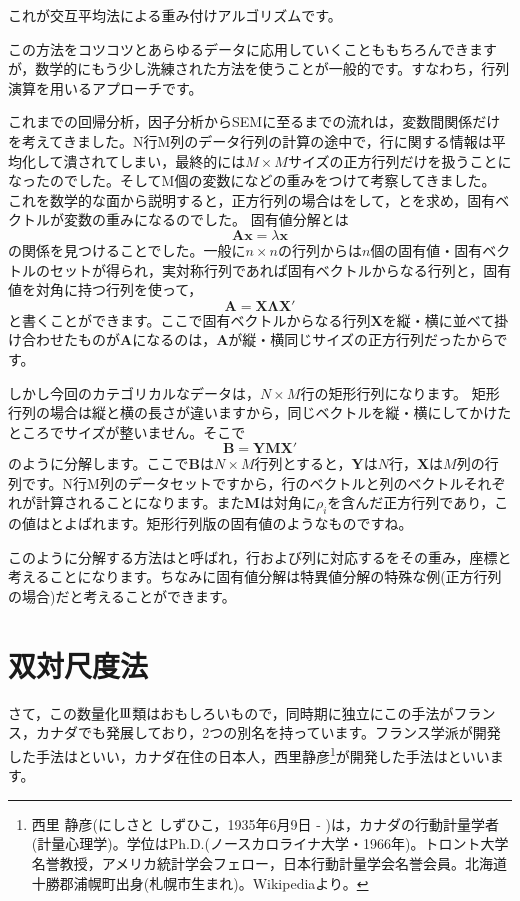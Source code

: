 \documentclass{ltjsbook}
\begin{document}
これが交互平均法による重み付けアルゴリズムです。

この方法をコツコツとあらゆるデータに応用していくことももちろんできますが，数学的にもう少し洗練された方法を使うことが一般的です。すなわち，行列演算を用いるアプローチです。

これまでの回帰分析，因子分析からSEMに至るまでの流れは，変数間関係だけを考えてきました。N行M列のデータ行列の計算の途中で，行に関する情報は平均化して潰されてしまい，最終的には$M \times M$サイズの正方行列だけを扱うことになったのでした。そしてM個の変数になどの重みをつけて考察してきました。
これを数学的な面から説明すると，正方行列の場合はをして，とを求め，固有ベクトルが変数の重みになるのでした。
固有値分解とは
\[ \bm{Ax} = \lambda\bm{x} \]
の関係を見つけることでした。一般に$n\times n$の行列からは$n$個の固有値・固有ベクトルのセットが得られ，実対称行列であれば固有ベクトルからなる行列と，固有値を対角に持つ行列を使って，
\[ \bm{A} = \bm{X \Lambda X}' \]
と書くことができます。ここで固有ベクトルからなる行列$\bm{X}$を縦・横に並べて掛け合わせたものが$\bm{A}$になるのは，$\bm{A}$が縦・横同じサイズの正方行列だったからです。

しかし今回のカテゴリカルなデータは，$N\times M$行の矩形行列になります。
矩形行列の場合は縦と横の長さが違いますから，同じベクトルを縦・横にしてかけたところでサイズが整いません。そこで
\[ \bm{B} = \bm{Y M X}' \]
のように分解します。ここで$\bm{B}$は$N \times M$行列とすると，$\bm{Y}$は$N$行，$\bm{X}$は$M$列の行列です。N行M列のデータセットですから，行のベクトルと列のベクトルそれぞれが計算されることになります。また$\bm{M}$は対角に$\rho_i$を含んだ正方行列であり，この値はとよばれます。矩形行列版の固有値のようなものですね。

このように分解する方法はと呼ばれ，行および列に対応するをその重み，座標と考えることになります。ちなみに固有値分解は特異値分解の特殊な例(正方行列の場合)だと考えることができます。

\section{双対尺度法}
さて，この数量化$\mathrm{I}\hspace{-1.2pt}\mathrm{I}\hspace{-1.2pt}\mathrm{I}$類はおもしろいもので，同時期に独立にこの手法がフランス，カナダでも発展しており，2つの別名を持っています。フランス学派が開発した手法はといい，カナダ在住の日本人，西里静彦\footnote{西里 静彦(にしさと しずひこ，1935年6月9日 - )は，カナダの行動計量学者(計量心理学)。学位はPh.D.(ノースカロライナ大学・1966年)。トロント大学名誉教授，アメリカ統計学会フェロー，日本行動計量学会名誉会員。北海道十勝郡浦幌町出身(札幌市生まれ)。Wikipediaより。}が開発した手法はといいます。
\end{document}
